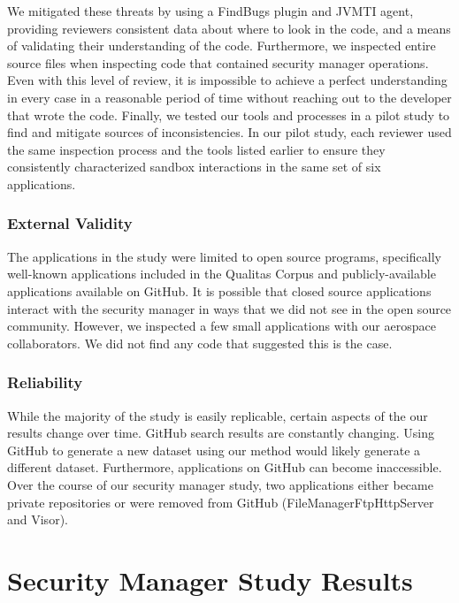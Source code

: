 \documentclass{sig-alternate}
\begin{document}
We mitigated these threats by using a FindBugs plugin and JVMTI agent,
providing reviewers consistent data about where to look in the code,
and a means of validating their understanding of the code. Furthermore,
we inspected entire source files when inspecting code that contained
security manager operations. Even with this level of review, it is
impossible to achieve a perfect understanding in every case in a reasonable
period of time without reaching out to the developer that wrote the
code. Finally, we tested our tools and processes in a pilot study
to find and mitigate sources of inconsistencies. In our pilot study,
each reviewer used the same inspection process and the tools listed
earlier to ensure they consistently characterized sandbox interactions
in the same set of six applications.


\subsubsection{External Validity}

The applications in the study were limited to open source programs,
specifically well-known applications included in the Qualitas Corpus
and publicly-available applications available on GitHub. It is possible
that closed source applications interact with the security manager
in ways that we did not see in the open source community. However,
we inspected a few small applications with our aerospace collaborators.
We did not find any code that suggested this is the case. 


\subsubsection{Reliability}

While the majority of the study is easily replicable, certain aspects
of the our results change over time. GitHub search results are constantly
changing. Using GitHub to generate a new dataset using our method
would likely generate a different dataset. Furthermore, applications
on GitHub can become inaccessible. Over the course of our security
manager study, two applications either became private repositories
or were removed from GitHub (FileManagerFtpHttpServer and Visor).


\section{Security Manager Study Results}\label{sec:Study-results}
\end{document}
